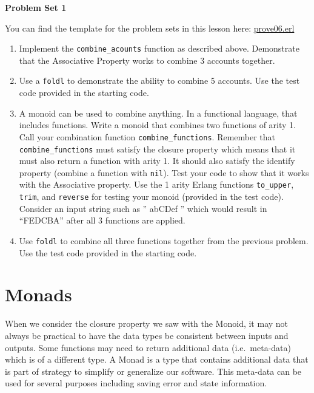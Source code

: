 \documentclass[
]{book}
\providecommand{\tightlist}{%
  \setlength{\itemsep}{0pt}\setlength{\parskip}{0pt}}
\begin{document}
\begin{problembox}

\textbf{Problem Set 1}

You can find the template for the problem sets in this lesson here: \href{proves/prove06.erl}{prove06.erl}

\begin{enumerate}
\def\labelenumi{\arabic{enumi}.}
\tightlist
\item
  Implement the \texttt{combine\_acounts} function as described above. Demonstrate that the Associative Property works to combine 3 accounts together.
\item
  Use a \texttt{foldl} to demonstrate the ability to combine 5 accounts. Use the test code provided in the starting code.
\item
  A monoid can be used to combine anything. In a functional language, that includes functions. Write a monoid that combines two functions of arity 1. Call your combination function \texttt{combine\_functions}. Remember that \texttt{combine\_functions} must satisfy the closure property which means that it must also return a function with arity 1. It should also satisfy the identify property (combine a function with \texttt{nil}). Test your code to show that it works with the Associative property. Use the 1 arity Erlang functions \texttt{to\_upper}, \texttt{trim}, and \texttt{reverse} for testing your monoid (provided in the test code). Consider an input string such as '' abCDef '' which would result in ``FEDCBA'' after all 3 functions are applied.
\item
  Use \texttt{foldl} to combine all three functions together from the previous problem. Use the test code provided in the starting code.
\end{enumerate}

\end{problembox}

\hypertarget{monads}{%
\section{Monads}\label{monads}}

When we consider the closure property we saw with the Monoid, it may not always be practical to have the data types be consistent between inputs and outputs. Some functions may need to return additional data (i.e.~meta-data) which is of a different type. A Monad is a type that contains additional data that is part of strategy to simplify or generalize our software. This meta-data can be used for several purposes including saving error and state information.
\end{document}
